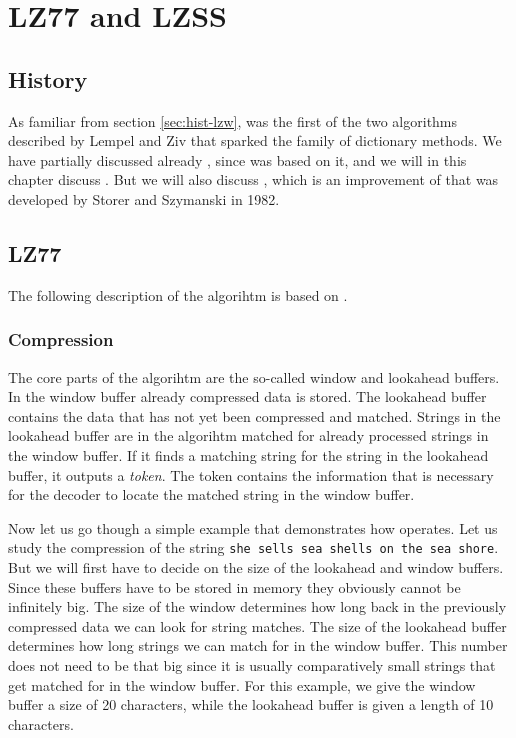 \begin{comment}
  
\end{comment}

\chapter{LZ77 and LZSS}
\label{cha:lz77-lzss}

\section{History}

As familiar from section \ref{sec:hist-lzw}, \lzone was the first of
the two algorithms described by Lempel and Ziv that sparked the family
of dictionary methods. We have partially discussed already \lztwo,
since \lzw was based on it, and we will in this chapter discuss
\lzone. But we will also discuss \lzss, which is an improvement of
\lzone that was developed by Storer and Szymanski in 1982.

\section{LZ77}

The following description of the \lzone algorihtm is based on
\cite{Salomon:2004:DCC,mark1996data_compression_book,mcfadden92:_hackin_data_compr_ziv_lempel}.

\subsection{Compression}

The core parts of the \lzone algorihtm are the so-called window and
lookahead buffers. In the window buffer already compressed data is
stored. The lookahead buffer contains the data that has not yet been
compressed and matched. Strings in the lookahead buffer are in the
algorihtm matched for already processed strings in the window
buffer. If it finds a matching string for the string in the lookahead
buffer, it outputs a \textit{token}. The token contains the
information that is necessary for the decoder to locate the matched
string in the window buffer.

Now let us go though a simple example that demonstrates how \lzone
operates. Let us study the \lzone compression of the string \texttt{she
  sells sea shells on the sea shore}. But we will first have to decide
on the size of the lookahead and window buffers. Since these buffers
have to be stored in memory they obviously cannot be infinitely
big. The size of the window determines how long back in the previously
compressed data we can look for string matches. The size of the
lookahead buffer determines how long strings we can match for in the
window buffer. This number does not need to be that big since it is
usually comparatively small strings that get matched for in the window
buffer. For this example, we give the window buffer a size of 20
characters, while the lookahead buffer is given a length of 10
characters.

